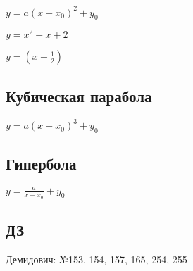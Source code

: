 \documentclass{article}
\begin{document}
$y = a(x - x_0)^2 + y_0$

$y = x^2 - x + 2$

$y = (x - \frac{1}{2})$

\subsection{Кубическая парабола}

$y = a(x - x_0)^3 + y_0$

\subsection{Гипербола}

$y = \frac{a}{x - x_0} + y_0$

\subsection{ДЗ}

Демидович:
№153, 154, 157, 165, 254, 255
\end{document}
